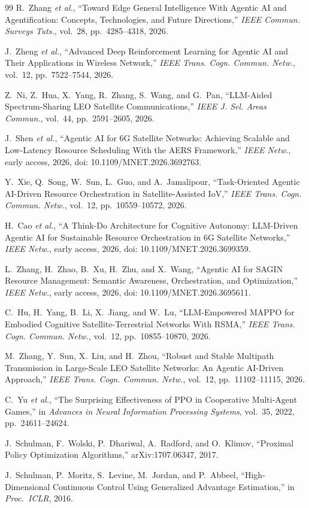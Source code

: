 \documentclass[journal]{IEEEtran}
\begin{document}
\begin{thebibliography}{99}
R.~Zhang \emph{et al.}, ``Toward Edge General Intelligence With Agentic AI and Agentification: Concepts, Technologies, and Future Directions,'' \emph{IEEE Commun. Surveys Tuts.}, vol.~28, pp.~4285--4318, 2026.

J.~Zheng \emph{et al.}, ``Advanced Deep Reinforcement Learning for Agentic AI and Their Applications in Wireless Network,'' \emph{IEEE Trans. Cogn. Commun. Netw.}, vol.~12, pp.~7522--7544, 2026.

Z.~Ni, Z.~Hua, X.~Yang, R.~Zhang, S.~Wang, and G.~Pan, ``LLM-Aided Spectrum-Sharing LEO Satellite Communications,'' \emph{IEEE J. Sel. Areas Commun.}, vol.~44, pp.~2591--2605, 2026.

J.~Shen \emph{et al.}, ``Agentic AI for 6G Satellite Networks: Achieving Scalable and Low-Latency Resource Scheduling With the AERS Framework,'' \emph{IEEE Netw.}, early access, 2026, doi: 10.1109/MNET.2026.3692763.

Y.~Xie, Q.~Song, W.~Sun, L.~Guo, and A.~Jamalipour, ``Task-Oriented Agentic AI-Driven Resource Orchestration in Satellite-Assisted IoV,'' \emph{IEEE Trans. Cogn. Commun. Netw.}, vol.~12, pp.~10559--10572, 2026.

H.~Cao \emph{et al.}, ``A Think-Do Architecture for Cognitive Autonomy: LLM-Driven Agentic AI for Sustainable Resource Orchestration in 6G Satellite Networks,'' \emph{IEEE Netw.}, early access, 2026, doi: 10.1109/MNET.2026.3699359.

L.~Zhang, H.~Zhao, B.~Xu, H.~Zhu, and X.~Wang, ``Agentic AI for SAGIN Resource Management: Semantic Awareness, Orchestration, and Optimization,'' \emph{IEEE Netw.}, early access, 2026, doi: 10.1109/MNET.2026.3695611.

C.~Hu, H.~Yang, B.~Li, X.~Jiang, and W.~Lu, ``LLM-Empowered MAPPO for Embodied Cognitive Satellite-Terrestrial Networks With RSMA,'' \emph{IEEE Trans. Cogn. Commun. Netw.}, vol.~12, pp.~10855--10870, 2026.

M.~Zhang, Y.~Sun, X.~Liu, and H.~Zhou, ``Robust and Stable Multipath Transmission in Large-Scale LEO Satellite Networks: An Agentic AI-Driven Approach,'' \emph{IEEE Trans. Cogn. Commun. Netw.}, vol.~12, pp.~11102--11115, 2026.

C.~Yu \emph{et al.}, ``The Surprising Effectiveness of PPO in Cooperative Multi-Agent Games,'' in \emph{Advances in Neural Information Processing Systems}, vol.~35, 2022, pp.~24611--24624.

J.~Schulman, F.~Wolski, P.~Dhariwal, A.~Radford, and O.~Klimov, ``Proximal Policy Optimization Algorithms,'' arXiv:1707.06347, 2017.

J.~Schulman, P.~Moritz, S.~Levine, M.~Jordan, and P.~Abbeel, ``High-Dimensional Continuous Control Using Generalized Advantage Estimation,'' in \emph{Proc.\ ICLR}, 2016.

\end{thebibliography}
\end{document}
